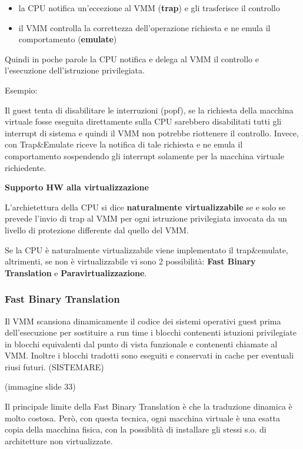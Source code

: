 \documentclass{article}
\begin{document}
\begin{itemize}
    \item la CPU notifica un'eccezione al VMM (\textbf{trap}) e gli trasferisce il controllo
    \item il VMM controlla la correttezza dell'operazione richiesta e ne emula il comportamento (\textbf{emulate})
\end{itemize}

Quindi in poche parole la CPU notifica e delega al VMM il controllo e l'esecuzione dell'istruzione privilegiata.

Esempio:

Il guest tenta di disabilitare le interruzioni (popf), se la richiesta della macchina virtuale fosse eseguita direttamente sulla CPU sarebbero disabilitati
tutti gli interrupt di sistema e quindi il VMM non potrebbe riottenere il controllo. Invece, con Trap\&Emulate riceve la notifica di tale richiesta e ne emula
il comportamento sospendendo gli interrupt solamente per la macchina virtuale richiedente.

\vspace{3mm}
\textbf{Supporto HW alla virtualizzazione}

L'archietettura della CPU si dice \textbf{naturalmente virtualizzabile} se e solo se prevede l'invio di trap al VMM per ogni istruzione privilegiata invocata da un
livello di protezione differente dal quello del VMM.

Se la CPU è naturalmente virtualizzabile viene implementato il trap\&emulate, altrimenti, se non è virtualizzabile vi sono 2 possibilità: \textbf{Fast Binary Translation} e 
\textbf{Paravirtualizzazione}.

\subsubsection{Fast Binary Translation}
Il VMM scansiona dinamicamente il codice dei sistemi operativi guest prima dell'esecuzione per sostituire a run time i blocchi contenenti istuzioni privilegiate
in blocchi equivalenti dal punto di vista funzionale e contenenti chiamate al VMM. Inoltre i blocchi tradotti sono eseguiti e conservati in cache per eventuali
riusi futuri. (SISTEMARE)

(immagine slide 33)

Il principale limite della Fast Binary Translation è che la traduzione dinamica è molto costosa. Però, con questa tecnica, ogni macchina virtuale è una esatta
copia della macchina fisica, con la possiblità di installare gli stessi s.o. di architetture non virtualizzate.
\end{document}
